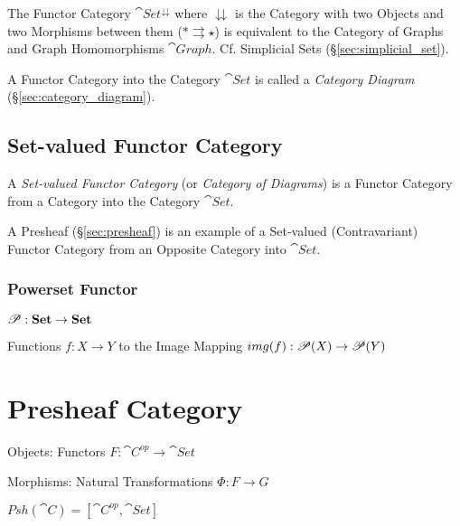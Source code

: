 The Functor Category $\cat{Set}^\downdownarrows$ where
$\downdownarrows$ is the Category with two Objects and two Morphisms
between them ($* \rightrightarrows \star$) is equivalent to the
Category of Graphs and Graph Homomorphisms $\cat{Graph}$. Cf.
Simplicial Sets (\S\ref{sec:simplicial_set}).

A Functor Category into the Category $\cat{Set}$ is called a
\emph{Category Diagram} (\S\ref{sec:category_diagram}).



\subsection{Set-valued Functor Category}\label{sec:setvalued_functor}

A \emph{Set-valued Functor Category} (or \emph{Category of Diagrams})
is a Functor Category from a Category into the Category
$\cat{Set}$.

A Presheaf (\S\ref{sec:presheaf}) is an example of a Set-valued
(Contravariant) Functor Category from an Opposite Category into
$\cat{Set}$.



\subsubsection{Powerset Functor}\label{sec:powerset_functor}

$\mathscr{P} : \mathbf{Set} \rightarrow \mathbf{Set}$

Functions $f : X \rightarrow Y$ to the Image Mapping $img(f) :
\mathscr{P}(X) \rightarrow \mathscr{P}(Y)$



\section{Presheaf Category}\label{sec:presheaf_category}

Objects: Functors $F: \cat{C}^{op} \rightarrow \cat{Set}$

Morphisms: Natural Transformations $\Phi : F \rightarrow G$

$Psh(\cat{C}) = [\cat{C}^{op},\cat{Set}]$




